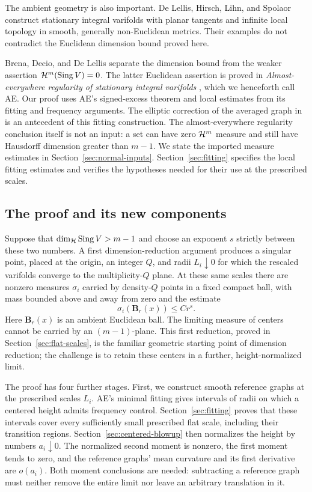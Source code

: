 The ambient geometry is also important. De Lellis, Hirsch, Lihn, and
Spolaor \cite{DLHLS2026} construct stationary integral varifolds with
planar tangents and infinite local topology in smooth, generally
non-Euclidean metrics. Their examples do not contradict the Euclidean
dimension bound proved here.

Brena, Decio, and De Lellis \cite[Conjectures~1.1 and~1.2]{BDD2025}
separate the dimension bound from the weaker assertion
$\mathcal H^m(\operatorname{Sing} V)=0$. The latter Euclidean assertion is proved in
\emph{Almost-everywhere regularity of stationary integral varifolds}
\cite{AE}, which we henceforth call AE. Our proof uses AE's signed-excess
theorem and local estimates from its fitting and frequency arguments.
The elliptic correction of the averaged graph in
\cite[Sections~6.3--6.4]{BDLF2025} is an antecedent of this fitting
construction. The almost-everywhere
regularity conclusion itself is not an input: a set can have zero
$\mathcal H^m$ measure and still have Hausdorff dimension greater than $m-1$.
We state the imported measure estimates in
Section~\ref{sec:normal-inputs}. Section~\ref{sec:fitting} specifies
the local fitting estimates and verifies the hypotheses needed for
their use at the prescribed scales.

\subsection{The proof and its new components}
Suppose that $\dim_{\mathcal H}\operatorname{Sing} V>m-1$ and choose an exponent $s$ strictly
between these two numbers. A first dimension-reduction argument produces
a singular point, placed at the origin, an integer $Q$, and radii
$L_i\downarrow0$ for which the rescaled varifolds converge to the
multiplicity-$Q$ plane. At these same scales there are nonzero measures
$\sigma_i$ carried by density-$Q$ points in a fixed compact ball, with
mass bounded above and away from zero and the estimate
\[
 \sigma_i(\mathbf B_r(x))\le Cr^s.
\]
Here $\mathbf B_r(x)$ is an ambient Euclidean ball. The limiting measure
of centers cannot be carried by an $(m-1)$-plane. This first reduction,
proved in Section~\ref{sec:flat-scales}, is the familiar geometric
starting point of dimension reduction; the challenge is to retain
these centers in a further, height-normalized limit.

The proof has four further stages. First, we construct smooth
reference graphs at the prescribed scales $L_i$. AE's minimal fitting
gives intervals of radii on which a centered height admits frequency
control. Section~\ref{sec:fitting} proves that these intervals cover
every sufficiently small prescribed flat scale, including their
transition regions. Section~\ref{sec:centered-blowup} then normalizes
the height by numbers $a_i\downarrow0$. The normalized second moment
is nonzero, the first moment tends to zero, and the reference graphs'
mean curvature and its first derivative are $o(a_i)$.
Both moment conclusions are needed: subtracting a reference graph
must neither remove the entire limit nor leave an arbitrary translation
in it.

